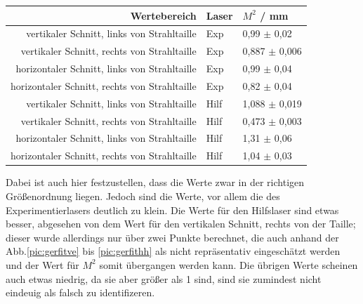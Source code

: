 \begin{table}
    \centering
    \begin{tabular}{rll}
        \toprule
        Wertebereich & Laser & $M^2$ / mm \\
        \midrule
        vertikaler Schnitt, links von Strahltaille & Exp & 0,99 $\pm$ 0,02 \\
        vertikaler Schnitt, rechts von Strahltaille & Exp & 0,887 $\pm$ 0,006 \\
        horizontaler Schnitt, links von Strahltaille & Exp & 0,99 $\pm$ 0,04 \\
        horizontaler Schnitt, rechts von Strahltaille & Exp & 0,82 $\pm$ 0,04 \\
        vertikaler Schnitt, links von Strahltaille & Hilf & 1,088 $\pm$ 0,019 \\
        vertikaler Schnitt, rechts von Strahltaille & Hilf & 0,473 $\pm$ 0,003 \\
        horizontaler Schnitt, links von Strahltaille & Hilf & 1,31 $\pm$ 0,06 \\
        horizontaler Schnitt, rechts von Strahltaille & Hilf & 1,04 $\pm$ 0,03 \\
        \bottomrule
    \end{tabular}
    \label{tab:Mfern}
\end{table}
Dabei ist auch hier festzustellen, dass die Werte zwar in der richtigen Größenordnung liegen. Jedoch sind die Werte, vor allem die des Experimentierlasers deutlich zu klein. 
Die Werte für den Hilfslaser sind etwas besser, abgesehen von dem Wert für den vertikalen Schnitt, rechts von der Taille; dieser wurde allerdings nur über zwei Punkte berechnet, 
die auch anhand der Abb.\ref{pic:gerfitve} bis \ref{pic:gerfithh} als nicht repräsentativ eingeschätzt werden und der Wert für $M^2$ somit übergangen werden kann. Die übrigen Werte scheinen auch 
etwas niedrig, da sie aber größer als 1 sind, sind sie zumindest nicht eindeuig als falsch zu identifizeren. 

